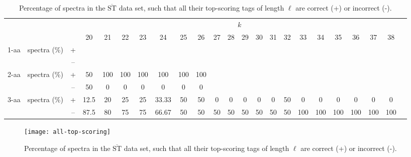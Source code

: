 \documentclass{article}[12pt]
\def\STbar{{\overline{\mathrm{ST}}}}
\begin{document}
\begin{landscape}
\begin{table}[ht]
\vspace{3mm}
\end{table}
\begin{table}[ht]\tiny
\vspace{3mm}
{\centering
\begin{center}
\begin{tabular}{|c|cc|c|c|c|c|c|c|c|c|c|c|c|c|c|c|c|c|c|c|c|c|}
  \hline
  \multicolumn{3}{|c|}{ } & \multicolumn{ 19}{|c|}{$k$} \\
  \cline{4-22 }
  \multicolumn{3}{|c|}{ } 
 & 20 & 21 & 22 & 23 & 24 & 25 & 26 & 27 & 28 & 29 & 30 & 31 & 32 & 33 & 34 & 35 & 36 & 37 & 38\\
\hline
  \multirow{2}{*}{1-aa}& \multirow{2}{*}{spectra (\%)}  &  +
 &  &  &  &  &  &  &  &  &  &  &  &  &  &  &  &  &  &  & \\
 & 
 &  --
 &  &  &  &  &  &  &  &  &  &  &  &  &  &  &  &  &  &  & \\
\hline
  \multirow{2}{*}{2-aa}& \multirow{2}{*}{spectra (\%)}  &  +
 & 50 & 100 & 100 & 100 & 100 & 100 & 100 &  &  &  &  &  &  &  &  &  &  &  & \\
 & 
 &  --
 & 50 & 0 & 0 & 0 & 0 & 0 & 0 &  &  &  &  &  &  &  &  &  &  &  & \\
\hline
  \multirow{2}{*}{3-aa}& \multirow{2}{*}{spectra (\%)}  &  +
 & 12.5 & 20 & 25 & 25 & 33.33 & 50 & 50 & 0 & 0 & 0 & 0 & 0 & 50 & 0 & 0 & 0 & 0 & 0 & 0\\
 & 
 &  --
 & 87.5 & 80 & 75 & 75 & 66.67 & 50 & 50 & 50 & 50 & 50 & 50 & 50 & 50 & 100 & 100 & 100 & 100 & 100 & 100 \\
  \hline
\end{tabular}
\end{center}
\par}
\centering

\caption{Percentage of spectra in the $\STbar$ data set, such that all their top-scoring tags of length $\ell$ are correct (+) or incorrect (-).}
\label{table:all-top-scoring}

\vspace{3mm}
\end{table}
\end{landscape}

\begin{figure}
  \begin{center}
\texttt{[image: all-top-scoring]}
\end{center}
\caption{Percentage of spectra in the $\STbar$ data set, such that all their top-scoring tags of length $\ell$ are correct (+) or incorrect (-).}
  \label{fig:all-top-scoring}
\end{figure}
\end{document}
